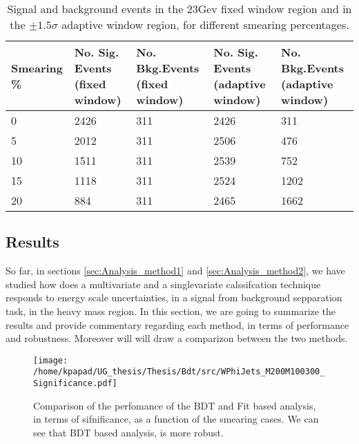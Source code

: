 \begin{table}[h!]
\centering
\begin{tabular}{|p{2cm}|p{3cm}|p{3cm}|p{3cm}|p{3cm}|}
 \hline
Smearing \%  & No. Sig. Events (fixed window) & No. Bkg.Events (fixed window) & No. Sig. Events (adaptive window) & No. Bkg.Events (adaptive window)  \\
\hline
0 & 2426 & 311 & 2426 & 311 \\
5 & 2012 & 311 & 2506 & 476 \\
10 & 1511 & 311 & 2539 & 752 \\
15 & 1118 & 311 & 2524 & 1202 \\
20 & 884 & 311 & 2465 & 1662 \\
 \hline
\end{tabular}
\caption{Signal and background events in the 23Gev fixed window region and in the $\pm 1.5\sigma$ adaptive window region, for different smearing percentages.}
\label{table:NumSigBkg}
\end{table}





\subsection{Results}
\label{sec:org1330ea3}
So far, in sections \ref{sec:Analysis_method1} and \ref{sec:Analysis_method2}, we have studied how does a multivariate and a singlevariate calssifcation technique responds to energy scale uncertainties, in a signal from background sepparation task, in the heavy mass region. In this section, we are going to summarize the results and provide commentary regarding each method, in terms of performance and robustness. Moreover will will draw a comparizon between the two methods.

\begin{figure}[htbp]
\centering
\texttt{[image: /home/kpapad/UG\_thesis/Thesis/Bdt/src/WPhiJets\_M200M100300\_Significance.pdf]}
\caption{ Comparison of the perfomance of the BDT and Fit based analysis, in terms of sifnificance,  as a function of the smearing cases. We can see that BDT based analysis, is more robust.}
\label{fig:BdtFitSig}
\end{figure}

